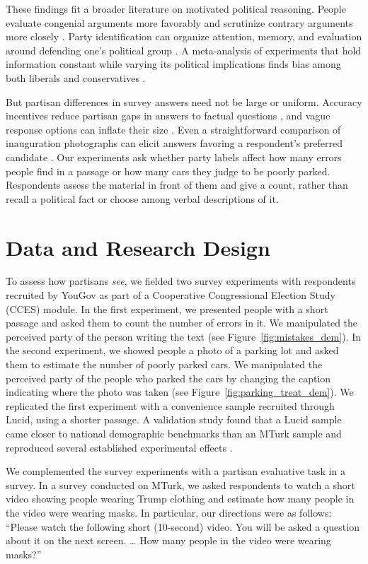\documentclass[12pt, letterpaper]{article}
\begin{document}
These findings fit a broader literature on motivated political reasoning. People evaluate congenial arguments more favorably and scrutinize contrary arguments more closely \citep{TaberLodge2006}. Party identification can organize attention, memory, and evaluation around defending one's political group \citep{VanBavelPereira2018}. A meta-analysis of experiments that hold information constant while varying its political implications finds bias among both liberals and conservatives \citep{DittoEtAl2019}.

But partisan differences in survey answers need not be large or uniform. Accuracy incentives reduce partisan gaps in answers to factual questions \citep{BullockEtAl2015,PriorSoodKhanna2015}, and vague response options can inflate their size \citep{RoushSood2023}. Even a straightforward comparison of inauguration photographs can elicit answers favoring a respondent's preferred candidate \citep{SchaffnerLuks2018}. Our experiments ask whether party labels affect how many errors people find in a passage or how many cars they judge to be poorly parked. Respondents assess the material in front of them and give a count, rather than recall a political fact or choose among verbal descriptions of it.

\section{Data and Research Design}
To assess how partisans \textit{see}, we fielded two survey experiments with respondents recruited by YouGov as part of a Cooperative Congressional Election Study (CCES) module. In the first experiment, we presented people with a short passage and asked them to count the number of errors in it. We manipulated the perceived party of the person writing the text (see Figure~\ref{fig:mistakes_dem}). In the second experiment, we showed people a photo of a parking lot and asked them to estimate the number of poorly parked cars. We manipulated the perceived party of the people who parked the cars by changing the caption indicating where the photo was taken (see Figure~\ref{fig:parking_treat_dem}). We replicated the first experiment with a convenience sample recruited through Lucid, using a shorter passage. A validation study found that a Lucid sample came closer to national demographic benchmarks than an MTurk sample and reproduced several established experimental effects \citep{CoppockMcClellan2019}.

We complemented the survey experiments with a partisan evaluative task in a survey. In a survey conducted on MTurk, we asked respondents to watch a short video showing people wearing Trump clothing and estimate how many people in the video were wearing masks. In particular, our directions were as follows: ``Please watch the following short (10-second) video. You will be asked a question about it on the next screen. \ldots{} How many people in the video were wearing masks?''
\end{document}
